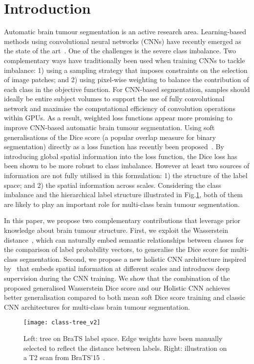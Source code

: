 \documentclass[runningheads,orivec,a4paper]{llncs}
\begin{document}
\section{Introduction}

Automatic brain tumour segmentation is an active research area.
Learning-based methods using convolutional neural networks (CNNs) have recently emerged as the state of the art~\cite{Havaei2017,deep_medic}.
One of the challenges is the severe class imbalance.
Two complementary ways have traditionally been used when training CNNs to tackle
imbalance: 1) using a sampling strategy that imposes
constraints on the selection of image patches; and 2) using pixel-wise weighting
to balance the contribution of each class in the objective function. 
For CNN-based segmentation, samples should ideally be entire
subject volumes to support the use of fully convolutional network and
maximise the computational efficiency of
convolution operations within GPUs.  
As a result, weighted loss functions appear more promising to improve
CNN-based automatic brain tumour
segmentation. 
Using soft generalisations of the Dice score (a popular
overlap measure for binary segmentation) directly as a loss function has
recently been proposed~\cite{v_net,Sudre2017}. By introducing global spatial
information into the loss function, the Dice loss has been shown to be
more robust to class imbalance.  
However at least two sources of information are not fully utilised in this formulation: 1) the
structure of the label space; and 2) the spatial information  across scales.
Considering the class imbalance and the hierarchical label structure illustrated in Fig.\ref{fig:tree}, both of them are likely to play an important role for multi-class brain
tumour segmentation. 

In this paper, we propose two complementary contributions that leverage
prior knowledge about brain tumour structure. 
First, we exploit the Wasserstein distance~\cite{wasserstein_loss,fast_emd}, which can
naturally embed semantic relationships between classes for the
comparison of label probability vectors, to generalise the Dice score
for multi-class segmentation.
Second, we propose a new holistic CNN architecture inspired
by~\cite{toolnet,hed} that embeds spatial information at different
scales and introduces deep supervision during the CNN training.
We show that the combination of the proposed generalised Wasserstein Dice score and our Holistic CNN achieves better generalisation
compared to both mean soft Dice score training and classic CNN architectures
for multi-class brain tumour segmentation. 
\begin{figure}[t!]
	\centering
	\texttt{[image: class-tree\_v2]}
	\caption{Left: tree on BraTS label space. Edge weights have been manually selected to reflect the distance between labels. Right: illustration on a T2 scan from BraTS'15~\cite{brats}.}
	\label{fig:tree}
\end{figure}
\end{document}
